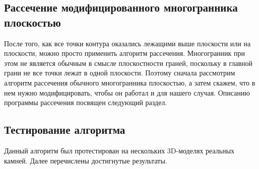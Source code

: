 \documentclass[a4paper,12pt, titlepage]{article}
\begin{document}
\subsection{Рассечение модифицированного многогранника плоскостью}
\begin{flushleft}
 После того, как все точки контура оказались лежащими выше плоскости или на плоскости, можно просто 
применить алгоритм рассечения. Многогранник при этом не является обычным в смысле плоскостности граней,
поскольку в главной грани не все точки лежат в одной плоскости. Поэтому сначала рассмотрим алгоритм
рассечения обычного многогранника плоскостью, а затем скажем, что в нем нужно модифицировать, чтобы он 
работал и для нашего случая. Описанию программы рассечения посвящен следующий раздел.
\end{flushleft}

\newpage
\subsection{Тестирование алгоритма}
\begin{flushleft}
 Данный алгоритм был протестирован на нескольких 3D-моделях реальных камней. Далее перечислены 
достигнутые результаты.
\end{flushleft}
\end{document}
